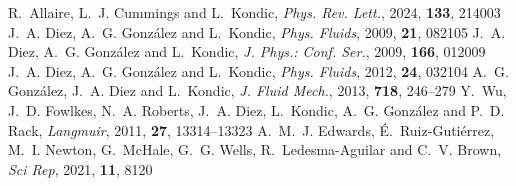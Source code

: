 \documentclass[twoside,twocolumn,9pt]{article}
\begin{document}
\begin{mcitethebibliography}{38}
R.~Allaire, L.~J. Cummings and L.~Kondic, \emph{Phys. Rev. Lett.}, 2024, \textbf{133}, 214003\relax
\mciteBstWouldAddEndPuncttrue
\mciteSetBstMidEndSepPunct{\mcitedefaultmidpunct}
{\mcitedefaultendpunct}{\mcitedefaultseppunct}\relax
\EndOfBibitem
{}
J.~A. Diez, A.~G. Gonz{\'a}lez and L.~Kondic, \emph{Phys. Fluids}, 2009, \textbf{21}, 082105\relax
\mciteBstWouldAddEndPuncttrue
\mciteSetBstMidEndSepPunct{\mcitedefaultmidpunct}
{\mcitedefaultendpunct}{\mcitedefaultseppunct}\relax
\EndOfBibitem
{}
J.~A. Diez, A.~G. Gonz{\'a}lez and L.~Kondic, \emph{J. Phys.: Conf. Ser.}, 2009, \textbf{166}, 012009\relax
\mciteBstWouldAddEndPuncttrue
\mciteSetBstMidEndSepPunct{\mcitedefaultmidpunct}
{\mcitedefaultendpunct}{\mcitedefaultseppunct}\relax
\EndOfBibitem
{}
J.~A. Diez, A.~G. Gonz{\'a}lez and L.~Kondic, \emph{Phys. Fluids}, 2012, \textbf{24}, 032104\relax
\mciteBstWouldAddEndPuncttrue
\mciteSetBstMidEndSepPunct{\mcitedefaultmidpunct}
{\mcitedefaultendpunct}{\mcitedefaultseppunct}\relax
\EndOfBibitem
{}
A.~G. Gonz{\'a}lez, J.~A. Diez and L.~Kondic, \emph{J. Fluid Mech.}, 2013, \textbf{718}, 246--279\relax
\mciteBstWouldAddEndPuncttrue
\mciteSetBstMidEndSepPunct{\mcitedefaultmidpunct}
{\mcitedefaultendpunct}{\mcitedefaultseppunct}\relax
\EndOfBibitem
{}
Y.~Wu, J.~D. Fowlkes, N.~A. Roberts, J.~A. Diez, L.~Kondic, A.~G. Gonz{\'a}lez and P.~D. Rack, \emph{Langmuir}, 2011, \textbf{27}, 13314--13323\relax
\mciteBstWouldAddEndPuncttrue
\mciteSetBstMidEndSepPunct{\mcitedefaultmidpunct}
{\mcitedefaultendpunct}{\mcitedefaultseppunct}\relax
\EndOfBibitem
{}
A.~M.~J. Edwards, {\'E}.~{Ruiz-Guti{\'e}rrez}, M.~I. Newton, G.~McHale, G.~G. Wells, R.~{Ledesma-Aguilar} and C.~V. Brown, \emph{Sci Rep}, 2021, \textbf{11}, 8120\relax
\mciteBstWouldAddEndPuncttrue
\mciteSetBstMidEndSepPunct{\mcitedefaultmidpunct}
{\mcitedefaultendpunct}{\mcitedefaultseppunct}\relax
\EndOfBibitem
{}

\end{mcitethebibliography}
\end{document}
